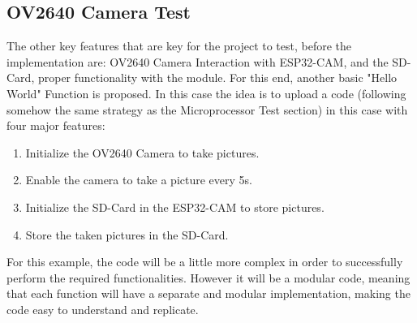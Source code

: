 \subsection{OV2640 Camera Test}
The other key features that are key for the project to test, before the implementation are: OV2640 Camera Interaction with ESP32-CAM, and the SD-Card, proper functionality with the module. For this end, another basic "Hello World" Function is proposed. In this case the idea is to upload a code (following somehow the same strategy as the Microprocessor Test section) in this case with four major features:
\begin{enumerate}
	\item Initialize the OV2640 Camera to take pictures.
	\item Enable the camera to take a picture every 5s.
	\item Initialize the SD-Card in the ESP32-CAM to store pictures.
	\item Store the taken pictures in the SD-Card. 
\end{enumerate}

For this example, the code will be a little more complex in order to successfully perform the required functionalities. However it will be a modular code, meaning that each function will have a separate and modular implementation, making the code easy to understand and replicate. \\

